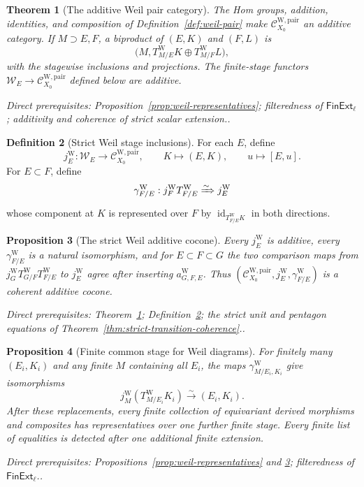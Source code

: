 \documentclass[10pt]{article}
\newtheorem{theorem}{Theorem}[section]
\newtheorem{proposition}[theorem]{Proposition}
\theoremstyle{definition}
\newtheorem{definition}[theorem]{Definition}
\newcommand{\PairW}{\mathcal C_{X_0}^{\mathrm{W,pair}}}
\newcommand{\depends}[1]{\par\smallskip\noindent\textit{Direct prerequisites:} #1.}
\begin{document}
\begin{theorem}[The additive Weil pair category]
\label{thm:weil-pair-additive}
The Hom groups, addition, identities, and composition of
Definition~\ref{def:weil-pair} make $\PairW$ an additive category.  If
$M\supset E,F$, a biproduct of $(E,K)$ and $(F,L)$ is
\[
 \bigl(M,T^{\mathrm W}_{M/E}K\oplus T^{\mathrm W}_{M/F}L\bigr),
\]
with the stagewise inclusions and projections.  The finite-stage functors
$\mathcal W_E\to\PairW$ defined below are additive.
\depends{Proposition~\ref{prop:weil-representatives}; filteredness of
$\mathsf{FinExt}_\ell$; additivity and coherence of strict scalar
extension.}
\end{theorem}

\begin{definition}[Strict Weil stage inclusions]
\label{def:weil-stage-inclusion}
For each $E$, define
\[
 j_E^{\mathrm W}:\mathcal W_E\longrightarrow\PairW,
 \qquad K\longmapsto(E,K),\qquad u\longmapsto[E,u].
\]
For $E\subset F$, define
\[
 \gamma^{\mathrm W}_{F/E}:
 j_F^{\mathrm W}T^{\mathrm W}_{F/E}
 \xRightarrow{\sim}j_E^{\mathrm W}
\]
whose component at $K$ is represented over $F$ by
$\operatorname{id}_{T^{\mathrm W}_{F/E}K}$ in both directions.
\end{definition}

\begin{proposition}[The strict Weil additive cocone]
\label{prop:weil-stage-cocone}
Every $j_E^{\mathrm W}$ is additive, every
$\gamma^{\mathrm W}_{F/E}$ is a natural isomorphism, and for
$E\subset F\subset G$ the two comparison maps from
$j_G^{\mathrm W}T^{\mathrm W}_{G/F}T^{\mathrm W}_{F/E}$ to
$j_E^{\mathrm W}$ agree after inserting $a^{\mathrm W}_{G,F,E}$.
Thus $(\PairW,j_E^{\mathrm W},\gamma^{\mathrm W}_{F/E})$ is a coherent
additive cocone.
\depends{Theorem~\ref{thm:weil-pair-additive};
Definition~\ref{def:weil-stage-inclusion}; the strict unit and pentagon
equations of Theorem~\ref{thm:strict-transition-coherence}.}
\end{proposition}

\begin{proposition}[Finite common stage for Weil diagrams]
\label{prop:weil-common-stage}
For finitely many $(E_i,K_i)$ and any finite $M$ containing all $E_i$, the
maps $\gamma^{\mathrm W}_{M/E_i,K_i}$ give isomorphisms
\[
 j_M^{\mathrm W}(T^{\mathrm W}_{M/E_i}K_i)
 \xrightarrow{\sim}(E_i,K_i).
\]
After these replacements, every finite collection of equivariant derived
morphisms and composites has representatives over one further finite
stage.  Every finite list of equalities is detected after one additional
finite extension.
\depends{Propositions~\ref{prop:weil-representatives} and
\ref{prop:weil-stage-cocone}; filteredness of $\mathsf{FinExt}_\ell$.}
\end{proposition}
\end{document}
